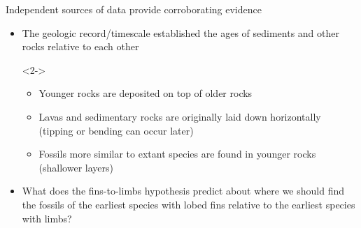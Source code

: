 \begin{frame}[t]
    \begin{adjustwidth}{-2em}{-1.5em}
        Independent sources of data provide corroborating evidence

        \begin{itemize}
            \item[1.] The geologic record/timescale established the ages of
                sediments and other rocks relative to each other

            \begin{uncoverenv}<2->
            \begin{itemize}
                \item Younger rocks are deposited on top of older rocks
                \item Lavas and sedimentary rocks are originally laid down
                    horizontally (tipping or bending can occur later)
                \item Fossils more similar to extant species are found in
                    younger rocks (shallower layers)
            \end{itemize}
            \end{uncoverenv}

            \item<3-> What does the fins-to-limbs hypothesis predict about
                where we should find the fossils of the earliest species with
                lobed fins relative to the earliest species with limbs?

        \end{itemize}

    \end{adjustwidth}
\end{frame}

